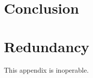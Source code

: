\documentclass[preprint]{beavtex}
\begin{document}
\chapter{Conclusion}








\appendix
\chapter{Redundancy}
This appendix is inoperable.
\end{document}
